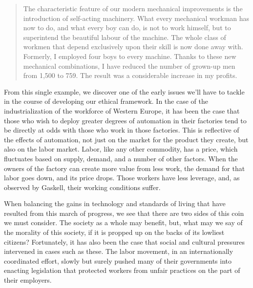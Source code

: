 \begin{quotation}\small
The characteristic feature of our modern mechanical 
improvements is the introduction of self-acting machinery. What every 
mechanical workman has now to do, and what every boy can do, is not to 
work himself, but to superintend the beautiful labour of the machine. 
The whole class of workmen that depend exclusively upon their skill is 
now done away with. Formerly, I employed four boys to every machine. 
Thanks to these new mechanical combinations, I have reduced the number 
of grown-up men from 1,500 to 759. The result was a considerable 
increase in my profits.\cite{marx1867strife}
\end{quotation}

From this single example, we discover one of the early issues we'll 
have to tackle in the course of developing our ethical framework.  
In the case of the industrialization of the workforce of Western 
Europe, it has been the case that those who wish to deploy greater 
degrees of automation in their factories tend to be directly at odds 
with those who work in those factories.  This is reflective of 
the effects of automation, not just on the market for the product they 
create, but also on the labor market.  Labor, like any other commodity, 
has a price, which fluctuates based on supply, demand, and a number of 
other factors.  When the owners of the factory can create more value 
from less work, the demand for that labor goes down, and its price 
drops.  Those workers have less leverage, and, as observed by Gaskell, 
their working conditions suffer.

When balancing the gains in technology and standards of living that 
have resulted from this march of progress, we see that there are two 
sides of this coin we must consider.  The society as a whole may 
benefit, but, what may we say of the morality of this society, if it 
is propped up on the backs of its lowliest citizens?  Fortunately, it 
has also been the case that social and cultural pressures intervened 
in cases such as these.  The labor movement, in an internationally 
coordinated effort, slowly but surely pushed many of their governments 
into enacting legislation that protected workers from unfair practices 
on the part of their employers.

